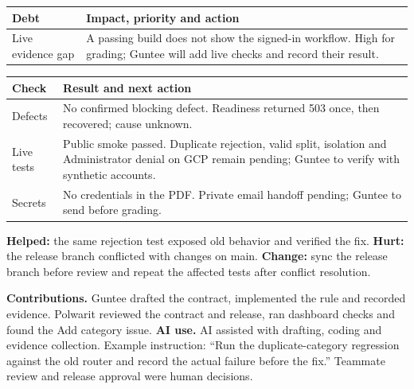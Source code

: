 \documentclass[11pt,a4paper]{article}
\begin{document}
\begin{tabularx}{\linewidth}{lX}
Debt & Impact, priority and action\\\hline
Live evidence gap & A passing build does not show the signed-in workflow. High for grading; Guntee will add live checks and record their result.\\
\end{tabularx}

\begin{tabularx}{\linewidth}{lX}
Check & Result and next action \\\hline
Defects & No confirmed blocking defect. Readiness returned 503 once, then recovered; cause unknown. \\
Live tests & Public smoke passed. Duplicate rejection, valid split, isolation and Administrator denial on GCP remain pending; Guntee to verify with synthetic accounts. \\
Secrets & No credentials in the PDF. Private email handoff pending; Guntee to send before grading. \\
\end{tabularx}

\textbf{Helped:} the same rejection test exposed old behavior and verified the fix. \textbf{Hurt:} the release branch conflicted with changes on main. \textbf{Change:} sync the release branch before review and repeat the affected tests after conflict resolution.

\textbf{Contributions.} Guntee drafted the contract, implemented the rule and recorded evidence. Polwarit reviewed the contract and release, ran dashboard checks and found the Add category issue. \textbf{AI use.} AI assisted with drafting, coding and evidence collection. Example instruction: ``Run the duplicate-category regression against the old router and record the actual failure before the fix.'' Teammate review and release approval were human decisions.
\end{document}
